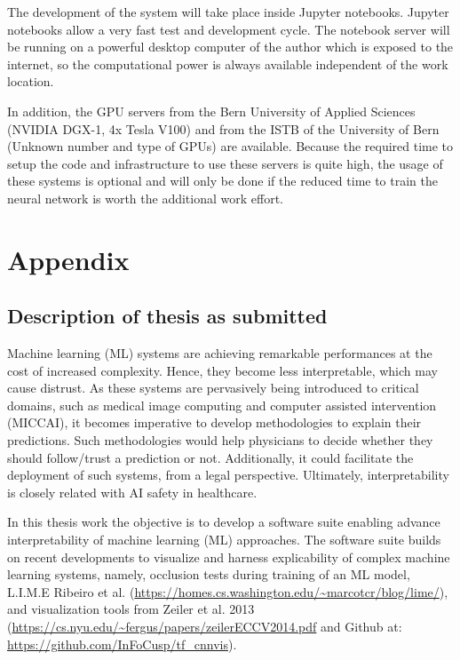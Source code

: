 The development of the system will take place inside Jupyter notebooks. Jupyter notebooks allow a very fast test and development cycle. The notebook server will be running on a powerful desktop computer of the author which is exposed to the internet, so the computational power is always available independent of the work location.

In addition, the GPU servers from the Bern University of Applied Sciences (NVIDIA DGX-1, 4x Tesla V100) and from the ISTB of the University of Bern (Unknown number and type of GPUs) are available. Because the required time to setup the code and infrastructure to use these servers is quite high, the usage of these systems is optional and will only be done if the reduced time to train the neural network is worth the additional work effort.


\chapter{Appendix}
\section{Description of thesis as submitted}

Machine learning (ML) systems are achieving remarkable performances at the cost of increased complexity. Hence, they become less interpretable, which may cause distrust. As these systems are pervasively being introduced to critical domains, such as medical image computing and computer assisted intervention (MICCAI), it becomes imperative to develop methodologies to explain their predictions. Such methodologies would help physicians to decide whether they should follow/trust a prediction or not. Additionally, it could facilitate the deployment of such systems, from a legal perspective. Ultimately, interpretability is closely related with AI safety in healthcare.

In this thesis work the objective is to develop a software suite enabling advance interpretability of machine learning (ML) approaches. The software suite builds on recent developments to visualize and harness explicability of complex machine learning systems, namely, occlusion tests during training of an ML model, L.I.M.E Ribeiro et al. (\url{https://homes.cs.washington.edu/~marcotcr/blog/lime/}), and visualization tools from Zeiler et al. 2013 (\url{https://cs.nyu.edu/~fergus/papers/zeilerECCV2014.pdf} and Github at: \url{https://github.com/InFoCusp/tf\_cnnvis}).
 
